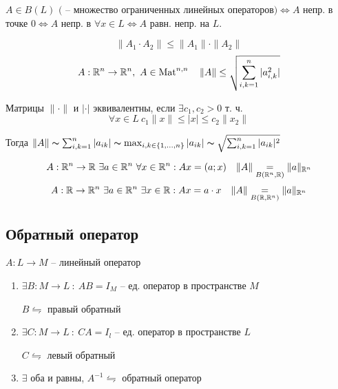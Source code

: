     \begin{proposition}
        $A \in B(L) \text{ ( -- множество ограниченных линейных операторов)} \Leftrightarrow A$ непр. в точке $0 \Leftrightarrow A$ непр. в $\forall x \in L \Leftrightarrow A$ равн. непр. на $L$.
    \end{proposition}

    \begin{remark}
        \[
            \| A_1 \cdot A_2 \| \le \| A_1 \| \cdot \| A_2 \|   
        \]
        \[
            A : \mathbb{R}^n \rightarrow \mathbb{R}^n, \ A \in \operatorname{Mat}^{n, n} \quad \| A \| \leq \sqrt{\sum_{i, k = 1}^n |a_{i, k}^2|}
        \]
    \end{remark}

    \begin{definition}
        Матрицы $\|\cdot\|$ и $|\cdot|$ эквивалентны, если $\exists c_1, c_2 > 0$ т. ч.
        \[
            \forall x \in L \ c_1 \|x\| \le |x| \le c_2 \|x_2\|
        \]
        \par Тогда $\| A \| \thicksim \sum_{i, k = 1}^n |a_{ik}| \thicksim \max_{i, k \in \{1, \dots, n\}} |a_{ik}| \thicksim \sqrt{\sum_{i, k = 1}^n |a_{ik}|^2}$
    \end{definition}

    \begin{remark}
        \[
            A : \mathbb{R}^n  \rightarrow \mathbb{R} \ \exists a \in \mathbb{R}^n \ \forall x \in \mathbb{R}^n : Ax = (a; x) \quad \| A \| \underset{B(\mathbb{R}^n, \mathbb{R})}{=} \| a \|_{\mathbb{R}^n}   
        \]
        \[
            A : \mathbb{R} \rightarrow \mathbb{R}^n \ \exists a \in \mathbb{R}^n \ \exists x \in \mathbb{R} : Ax = a \cdot x \quad \| A \| \underset{B(\mathbb{R}, \mathbb{R}^n)}{=} \| a \|_{\mathbb{R}^n}  
        \]
    \end{remark}

    \subsection*{Обратный оператор}
    
    $A : L \rightarrow M$ -- линейный оператор

    \begin{enumerate}
        \item $\exists B : M \rightarrow L \ : \ AB = I_M$ -- ед. оператор в пространстве $M$
        \par $B \leftrightharpoons$ правый обратный
        \item $\exists C : M \rightarrow L \ : \ CA = I_l$ -- ед. оператор в пространстве $L$
        \par $C \leftrightharpoons$ левый обратный
        \item $\exists$ оба и равны, $A^{-1} \leftrightharpoons$ обратный оператор
    \end{enumerate}

